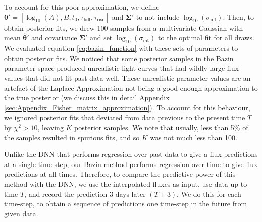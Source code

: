 \documentclass[fleqn,usenatbib]{mnras}
\begin{document}
To account for this poor approximation, we define $\bm{\theta'} = [\log_{10}{(A)}, B, t_0, \tau_{\mathrm{fall}}, \tau_{\mathrm{rise}}]$ and $\bm{\Sigma'}$ to not include  $\log_{10}{(\sigma_{\mathrm{int}})}$. Then, to obtain posterior fits, we drew 100 samples from a multivariate Gaussian with mean $\bm{\hat{\theta}'}$ and covariance $\bm{\Sigma'}$ and set $\log_{10}{(\sigma_{\mathrm{int}})}$ to the optimal fit for all draws. We evaluated equation \ref{eq:bazin_function} with these sets of parameters to obtain posterior fits. We noticed that some posterior samples in the Bazin parameter space produced unrealistic light curves that had wildly large flux values that did not fit past data well. These unrealistic parameter values are an artefact of the Laplace Approximation not being a good enough approximation to the true posterior (we discuss this in detail Appendix \ref{sec:Appendix_Fisher_matrix_approximation}). To account for this behaviour, we ignored posterior fits that deviated from data previous to the present time $T$ by $\chi^2 > 10$, leaving $K$ posterior samples. We note that usually, less than 5\% of the samples resulted in spurious fits, and so $K$ was not much less than 100.

Unlike the DNN that performs regression over past data to give a flux predictions at a single time-step, our Bazin method performs regression over time to give flux predictions at all times. Therefore, to compare the predictive power of this method with the DNN, we use the interpolated fluxes as input, use data up to time $T$, and record the prediction 3 days later $(T+3)$. We do this for each time-step, to obtain a sequence of predictions one time-step in the future from given data.
\end{document}
